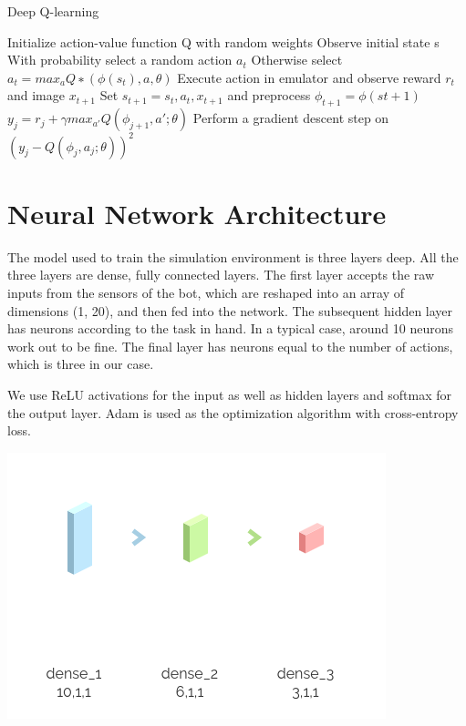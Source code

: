 \documentclass[12pt]{extreport}
\theoremstyle{plain}
\theoremstyle{definition}
\begin{document}
\begin{algorithm}
 \caption{Deep Q-learning}\label{q-learning}
 \begin{algorithmic}[1]
  \State Initialize action-value function Q with random weights
  \State Observe initial state s
  \State With probability select a random action $ a_t $
  \State Otherwise select $ a_t = max_a Q ∗ (\phi(s_t), a, \theta) $
  \State Execute action in emulator and observe reward $ r_t $ and image $ x_{t+1} $
  \State Set $ s_{t+1} = s_t, a_t, x_{t+1} $ and preprocess $ \phi_{t+1} = \phi(st+1) $
  \State $ y_j = r_j + \gamma max_{a'} Q(\phi_{j+1}, a'; \theta) $
  \State Perform a gradient descent step on $ (y_j - Q(\phi_j , a_j ; \theta))^2 $
  \EndFor
  \EndFor
 \end{algorithmic}
\end{algorithm}

\section{Neural Network Architecture}
The model used to train the simulation environment is three layers deep. All the three layers are dense, fully connected layers. The first layer accepts the raw inputs from the sensors of the bot, which are reshaped into an array of dimensions (1, 20), and then fed into the network. The subsequent hidden layer has neurons according to the task in hand. In a typical case, around 10 neurons work out to be fine. The final layer has neurons equal to the number of actions, which is three in our case.

We use ReLU activations for the input as well as hidden layers and softmax for the output layer. Adam is used as the optimization algorithm with cross-entropy loss.

\begin{center}
    \includegraphics[width=0.5\linewidth]{net.png}
\end{center}
\end{document}
